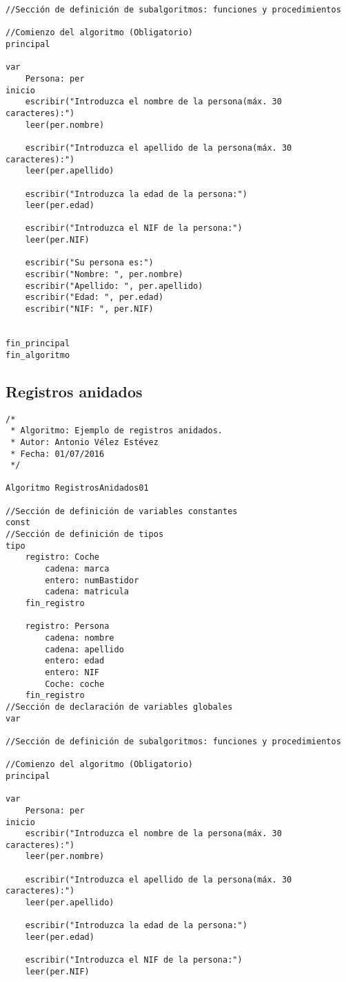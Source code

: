 \documentclass{article}
\begin{document}
\begin{appendices}
\begin{lstlisting}[language = pseudocodigoesp]
//Sección de definición de subalgoritmos: funciones y procedimientos	

//Comienzo del algoritmo (Obligatorio)
principal	

var
	Persona: per
inicio 	
	escribir("Introduzca el nombre de la persona(máx. 30 caracteres):")
	leer(per.nombre)
	
	escribir("Introduzca el apellido de la persona(máx. 30 caracteres):")
	leer(per.apellido)
	
	escribir("Introduzca la edad de la persona:")
	leer(per.edad)
	
	escribir("Introduzca el NIF de la persona:")
	leer(per.NIF)
	
	escribir("Su persona es:")
	escribir("Nombre: ", per.nombre)
	escribir("Apellido: ", per.apellido)
	escribir("Edad: ", per.edad)
	escribir("NIF: ", per.NIF)
	
	
fin_principal
fin_algoritmo
\end{lstlisting}
\subsection{Registros anidados}
\begin{lstlisting}[language = pseudocodigoesp]
/*
 * Algoritmo: Ejemplo de registros anidados.
 * Autor: Antonio Vélez Estévez
 * Fecha: 01/07/2016
 */
 
Algoritmo RegistrosAnidados01

//Sección de definición de variables constantes
const 
//Sección de definición de tipos
tipo
	registro: Coche
		cadena: marca
		entero: numBastidor
		cadena: matricula
	fin_registro
	
	registro: Persona
		cadena: nombre
		cadena: apellido
		entero: edad
		entero: NIF
		Coche: coche
	fin_registro
//Sección de declaración de variables globales	
var

//Sección de definición de subalgoritmos: funciones y procedimientos	

//Comienzo del algoritmo (Obligatorio)
principal	

var
	Persona: per
inicio 	
	escribir("Introduzca el nombre de la persona(máx. 30 caracteres):")
	leer(per.nombre)
	
	escribir("Introduzca el apellido de la persona(máx. 30 caracteres):")
	leer(per.apellido)
	
	escribir("Introduzca la edad de la persona:")
	leer(per.edad)
	
	escribir("Introduzca el NIF de la persona:")
	leer(per.NIF)
	

\end{lstlisting}
\end{appendices}
\end{document}
